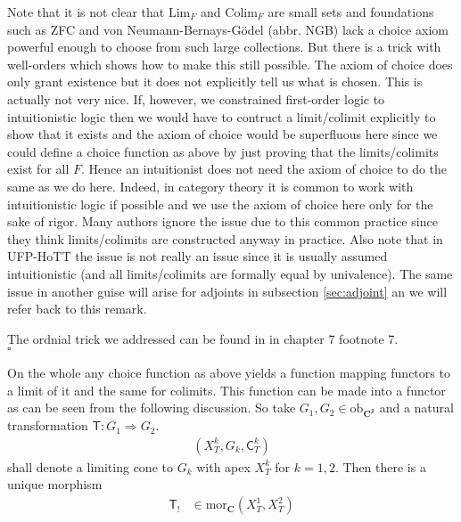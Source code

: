 \begin{rem}
\label{rem:ordinaltrick}
Note that it is not clear that $\mathrm{Lim}_{F}$ and $\mathrm{Colim}_{F}$ are small sets and foundations such as ZFC and von Neumann-Bernays-G\"odel (abbr. NGB) lack a choice axiom powerful enough to choose from such large collections. But there is a trick with well-orders which shows how to make this still possible. The axiom of choice does only grant existence but it does not explicitly tell us what is chosen. This is actually not very nice. If, however, we constrained first-order logic to intuitionistic logic then we would have to contruct a limit/colimit explicitly to show that it exists and the axiom of choice would be superfluous here since we could define a choice function as above by just proving that the limits/colimits exist for all $F$. Hence an intuitionist does not need the axiom of choice to do the same as we do here. Indeed, in category theory it is common to work with intuitionistic logic if possible and we use the axiom of choice here only for the sake of rigor. Many authors ignore the issue due to this common practice since they think limits/colimits are constructed anyway in practice. Also note that in UFP-HoTT the issue is not really an issue since it is usually assumed intuitionistic (and all limits/colimits are formally equal by univalence). The same issue in another guise will arise for adjoints in subsection \ref{sec:adjoint} an we will refer back to this remark.
\end{rem}
\begin{prf}
The ordnial trick we addressed can be found in \cite{53fd7d7e} in chapter 7 footnote 7.
\\
\phantom{proven}
\hfill
$\square$
\end{prf}
On the whole any choice function as above yields a function mapping functors to a limit of it and the same for colimits. This function can be made into a functor as can be seen from the following discussion. So take $G_{1},G_{2} \in \mathrm{ob}_{\mathbf{C}^{\mathbf{J}}}$ and a natural transformation $\mathsf{T} \colon G_{1} \Rightarrow G_{2}$.
\begin{align*}
  \left(
    X_{T}^{k},
    G_{k},
    \mathsf{C}_{T}^{k}
  \right)
\end{align*}
shall denote a limiting cone to $G_{k}$ with apex $X_{T}^{k}$ for $k = 1,2$. Then there is a unique morphism
\begin{align*}
  \mathsf{T}_{!}
  &\in
  \mathrm{mor}_{\mathbf{C}}
  \left(
    X_{T}^{1},
    X_{T}^{2}
  \right)
\end{align*}

